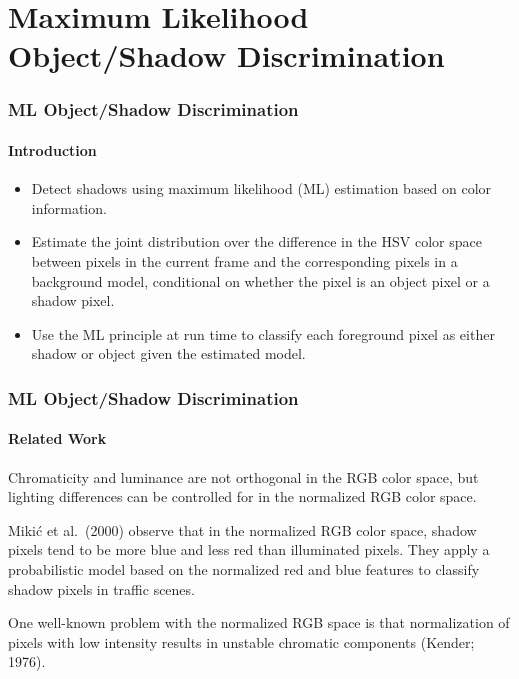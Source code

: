 
\section{Maximum Likelihood Object/Shadow Discrimination}

\begin{frame}
    \frametitle{ML Object/Shadow Discrimination}
    \framesubtitle{Introduction}

    \begin{itemize}
        \item Detect shadows using \alert{maximum likelihood} (ML) estimation 
            based on color information.
        \item Estimate the joint distribution over the difference in the 
            HSV color space between pixels in the current frame and the 
            corresponding pixels in a background model, conditional on 
            whether the pixel is an object pixel or a shadow pixel.
        \item Use the ML principle at run time to 
            classify each foreground pixel as either shadow or object given 
            the estimated model.
    \end{itemize}
  
\end{frame}


\ifnum{}

\begin{frame}
    \frametitle{ML Object/Shadow Discrimination}
    \framesubtitle{Related Work}

    Chromaticity and luminance are not orthogonal in the RGB color 
    space, but lighting differences can be controlled for in the 
    \alert{normalized} RGB color space.

    \bigskip

    Miki{\'c} et al.\ (2000) observe that in the normalized RGB color space, 
    shadow pixels tend to be more blue and less red than illuminated 
    pixels. They apply a probabilistic model based on the normalized 
    red and blue features to classify shadow pixels in traffic scenes.
  
    \bigskip

    One well-known problem with the normalized RGB space
    is that normalization of pixels with low intensity results
    in unstable chromatic components (Kender; 1976).

\end{frame}

